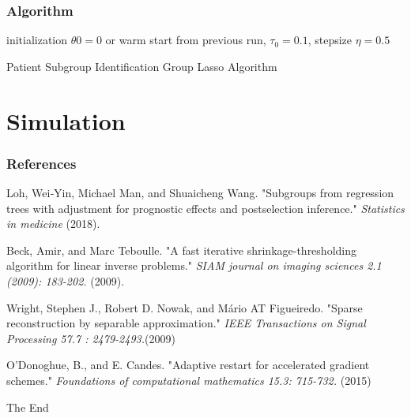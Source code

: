 \documentclass{beamer}
\begin{document}
\begin{frame}
\frametitle{Algorithm}
\begin{algorithm}[H]
 initialization $\theta0=0$ or warm start from previous run, $\tau_0=0.1$, stepsize $\eta=0.5$\;
 \caption{Patient Subgroup Identification Group Lasso Algorithm}
\end{algorithm}


\end{frame}


\section{Simulation}










\begin{frame}
\frametitle{References}
\footnotesize{
\begin{thebibliography}{99} %
 Loh, Wei‐Yin, Michael Man, and Shuaicheng Wang.  
\newblock "Subgroups from regression trees with adjustment for prognostic effects and postselection inference."
\newblock \emph{Statistics in medicine} (2018).

 Beck, Amir, and Marc Teboulle.
\newblock "A fast iterative shrinkage-thresholding algorithm for linear inverse problems."
\newblock \emph{ SIAM journal on imaging sciences 2.1 (2009): 183-202.  } (2009).

 Wright, Stephen J., Robert D. Nowak, and Mário AT Figueiredo.
 \newblock "Sparse reconstruction by separable approximation." 
\newblock \emph{IEEE Transactions on Signal Processing 57.7 : 2479-2493.}(2009)

 O’Donoghue, B., and E. Candes. 
\newblock  "Adaptive restart for accelerated gradient schemes." 
\newblock \emph{Foundations of computational mathematics 15.3: 715-732.} (2015)

\end{thebibliography}

}
\end{frame}


\begin{frame}
\Huge{\centerline{The End}}
\end{frame}

\end{document}
